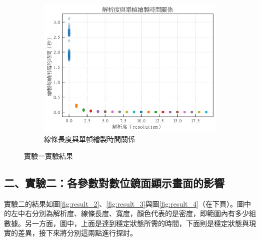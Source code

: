 \documentclass[12pt]{article}
\begin{document}
\begin{figure}[htbp]
  \begin{subfigure}{0.45\textwidth}
      \centering
      \includegraphics[width=\linewidth]{img/OutputImg/_Time_f-r.png} %
      \caption{線條長度與單幀繪製時間關係}
  \end{subfigure}

  \centering
  
  \caption{實驗一實驗結果}\label{fig:result_1}
\end{figure}

\newpage

\subsection{二、實驗二：各參數對數位鏡面顯示畫面的影響}

實驗二的結果如圖\ref{fig:result_2}、\ref{fig:result_3}與圖\ref{fig:result_4}（在下頁）。圖中的左中右分別為解析度、線條長度、寬度，顏色代表的是密度，即範圍內有多少組數據。另一方面，圖中，上面是達到穩定狀態所需的時間，下面則是穩定狀態與現實的差異，接下來將分別這兩點進行探討。
\end{document}
